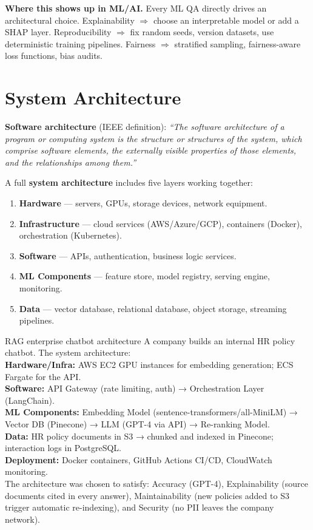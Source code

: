 \documentclass[a4paper,11pt]{article}
\newcommand{\vocab}[1]{\textbf{\color{navy}#1}}
\begin{document}
\noindent\textbf{Where this shows up in ML/AI.} Every ML QA directly drives an architectural choice. Explainability $\Rightarrow$ choose an interpretable model or add a SHAP layer. Reproducibility $\Rightarrow$ fix random seeds, version datasets, use deterministic training pipelines. Fairness $\Rightarrow$ stratified sampling, fairness-aware loss functions, bias audits.

\section{System Architecture}

\vocab{Software architecture} (IEEE definition): \emph{``The software architecture of a program or computing system is the structure or structures of the system, which comprise software elements, the externally visible properties of those elements, and the relationships among them.''}

A full \vocab{system architecture} includes five layers working together:
\begin{enumerate}
  \item \textbf{Hardware} --- servers, GPUs, storage devices, network equipment.
  \item \textbf{Infrastructure} --- cloud services (AWS/Azure/GCP), containers (Docker), orchestration (Kubernetes).
  \item \textbf{Software} --- APIs, authentication, business logic services.
  \item \textbf{ML Components} --- feature store, model registry, serving engine, monitoring.
  \item \textbf{Data} --- vector database, relational database, object storage, streaming pipelines.
\end{enumerate}

\begin{worked}{RAG enterprise chatbot architecture}
A company builds an internal HR policy chatbot. The system architecture: \\[4pt]
\textbf{Hardware/Infra:} AWS EC2 GPU instances for embedding generation; ECS Fargate for the API. \\
\textbf{Software:} API Gateway (rate limiting, auth) → Orchestration Layer (LangChain). \\
\textbf{ML Components:} Embedding Model (sentence-transformers/all-MiniLM) → Vector DB (Pinecone) → LLM (GPT-4 via API) → Re-ranking Model. \\
\textbf{Data:} HR policy documents in S3 → chunked and indexed in Pinecone; interaction logs in PostgreSQL. \\
\textbf{Deployment:} Docker containers, GitHub Actions CI/CD, CloudWatch monitoring. \\[4pt]
The architecture was chosen to satisfy: Accuracy (GPT-4), Explainability (source documents cited in every answer), Maintainability (new policies added to S3 trigger automatic re-indexing), and Security (no PII leaves the company network).
\end{worked}
\end{document}
